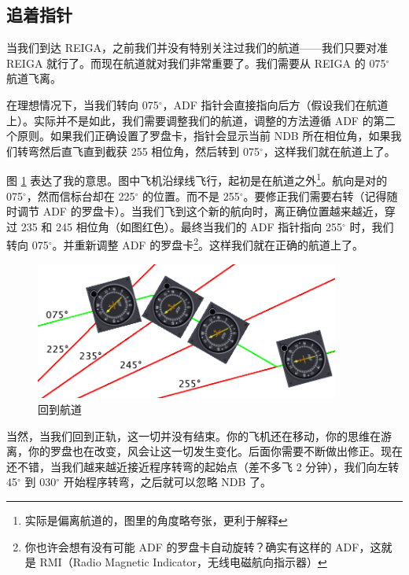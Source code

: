 \subsection{追着指针}

当我们到达 REIGA，之前我们并没有特别关注过我们的航道——我们只要对准 REIGA 就行了。而现在航道就对我们非常重要了。我们需要从 REIGA 的 075$^\circ$ 航道飞离。

在理想情况下，当我们转向 075$^\circ$，ADF 指针会直接指向后方（假设我们在航道上）。实际并不是如此，我们需要调整我们的航道，调整的方法遵循 ADF 的第二个原则。如果我们正确设置了罗盘卡，指针会显示当前 NDB 所在相位角，如果我们转弯然后直飞直到截获 255 相位角，然后转到 075$^\circ$，这样我们就在航道上了。

图 \ref{fig:NDB_flying} 表达了我的意思。图中飞机沿绿线飞行，起初是在航道之外\footnote{实际是偏离航道的，图里的角度略夸张，更利于解释}。航向是对的 075$^\circ$，然而信标台却在 225$^\circ$ 的位置。而不是 255$^\circ$。要修正我们需要右转（记得随时调节 ADF 的罗盘卡）。当我们飞到这个新的航向时，离正确位置越来越近，穿过 235 和 245 相位角（如图红色）。最终当我们的 ADF 指针指向 255$^\circ$ 时，我们转向 075$^\circ$。并重新调整 ADF 的罗盘卡\footnote{你也许会想有没有可能 ADF 的罗盘卡自动旋转？确实有这样的 ADF，这就是 RMI（Radio Magnetic Indicator，无线电磁航向指示器）}。这样我们就在正确的航道上了。

\begin{figure}
  \begin{center}
    \includegraphics[width=10cm]{img/NDB_flying}
    \caption{回到航道}
    \label{fig:NDB_flying}
  \end{center}
\end{figure}

当然，当我们回到正轨，这一切并没有结束。你的飞机还在移动，你的思维在游离，你的罗盘也在改变，风会让这一切发生变化。后面你需要不断做出修正。现在还不错，当我们越来越近接近程序转弯的起始点（差不多飞 2 分钟），我们向左转 45$^\circ$ 到  030$^\circ$ 开始程序转弯，之后就可以忽略 NDB 了。

